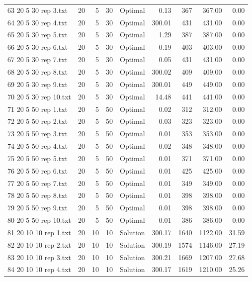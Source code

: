 \begin{longtable}{lrrllrrrr}
63 20 5 30 rep 3.txt & 20 & 5 & 30 & Optimal &  0.13 & 367 & 367.00 &  0.00\\
64 20 5 30 rep 4.txt & 20 & 5 & 30 & Optimal & 300.01 & 431 & 431.00 &  0.00\\
65 20 5 30 rep 5.txt & 20 & 5 & 30 & Optimal &  1.29 & 387 & 387.00 &  0.00\\
66 20 5 30 rep 6.txt & 20 & 5 & 30 & Optimal &  0.19 & 403 & 403.00 &  0.00\\
67 20 5 30 rep 7.txt & 20 & 5 & 30 & Optimal &  0.05 & 431 & 431.00 &  0.00\\
68 20 5 30 rep 8.txt & 20 & 5 & 30 & Optimal & 300.02 & 409 & 409.00 &  0.00\\
69 20 5 30 rep 9.txt & 20 & 5 & 30 & Optimal & 300.01 & 449 & 449.00 &  0.00\\
70 20 5 30 rep 10.txt & 20 & 5 & 30 & Optimal & 14.48 & 441 & 441.00 &  0.00\\
71 20 5 50 rep 1.txt & 20 & 5 & 50 & Optimal &  0.02 & 312 & 312.00 &  0.00\\
72 20 5 50 rep 2.txt & 20 & 5 & 50 & Optimal &  0.03 & 323 & 323.00 &  0.00\\
73 20 5 50 rep 3.txt & 20 & 5 & 50 & Optimal &  0.01 & 353 & 353.00 &  0.00\\
74 20 5 50 rep 4.txt & 20 & 5 & 50 & Optimal &  0.02 & 348 & 348.00 &  0.00\\
75 20 5 50 rep 5.txt & 20 & 5 & 50 & Optimal &  0.01 & 371 & 371.00 &  0.00\\
76 20 5 50 rep 6.txt & 20 & 5 & 50 & Optimal &  0.01 & 425 & 425.00 &  0.00\\
77 20 5 50 rep 7.txt & 20 & 5 & 50 & Optimal &  0.01 & 349 & 349.00 &  0.00\\
78 20 5 50 rep 8.txt & 20 & 5 & 50 & Optimal &  0.01 & 398 & 398.00 &  0.00\\
79 20 5 50 rep 9.txt & 20 & 5 & 50 & Optimal &  0.01 & 398 & 398.00 &  0.00\\
80 20 5 50 rep 10.txt & 20 & 5 & 50 & Optimal &  0.01 & 386 & 386.00 &  0.00\\
81 20 10 10 rep 1.txt & 20 & 10 & 10 & Solution & 300.17 & 1640 & 1122.00 & 31.59\\
82 20 10 10 rep 2.txt & 20 & 10 & 10 & Solution & 300.19 & 1574 & 1146.00 & 27.19\\
83 20 10 10 rep 3.txt & 20 & 10 & 10 & Solution & 300.21 & 1669 & 1207.00 & 27.68\\
84 20 10 10 rep 4.txt & 20 & 10 & 10 & Solution & 300.17 & 1619 & 1210.00 & 25.26\\

\end{longtable}
